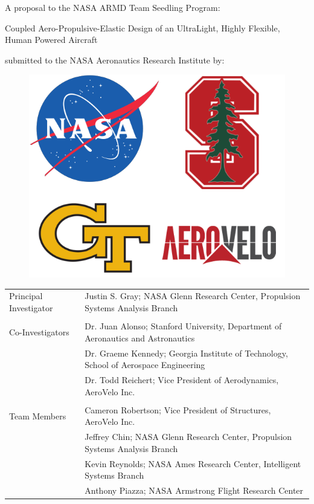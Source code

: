 \documentclass[]{aiaa-tc}
\begin{document}

  \vspace{4em}
  \begin{center}
    A proposal to the NASA ARMD Team Seedling Program: 
    \vspace{2em}

    {\Huge Coupled Aero­-Propulsive-Elastic Design of an Ultra­Light, Highly Flexible, Human Powered Aircraft}

    \vspace{2em}
    submitted to the NASA Aeronautics Research Institute by: 

    \vspace{3em}
    \begin{figure}
        \centering
        \includegraphics[width=.5\textwidth]{images/seedling_logos}
    \end{figure}
    \vspace{3em}


  \end{center}


  \begin{tabular}{l l}
    Principal Investigator & Justin S. Gray; NASA Glenn Research Center, Propulsion Systems Analysis Branch \\ 
    & \\
    Co-Investigators & Dr. Juan Alonso; Stanford University, Department of Aeronautics and Astronautics \\
                     & Dr. Graeme Kennedy; Georgia Institute of Technology, School of Aerospace Engineering \\ 
                     & Dr. Todd Reichert; Vice President of Aerodynamics, AeroVelo Inc. \\
    & \\ 
    Team Members & Cameron Robertson; Vice President of Structures, AeroVelo Inc. \\ 
                 & Jeffrey Chin; NASA Glenn Research Center, Propulsion Systems Analysis Branch \\
                 & Kevin Reynolds; NASA Ames Research Center, Intelligent Systems Branch \\
                 & Anthony Piazza; NASA Armstrong Flight Research Center \\
  \end{tabular}
\end{document}
